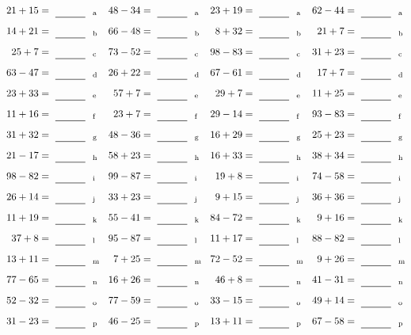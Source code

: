 \documentclass
[
  draft    = true,
  fontsize = 11pt,
  parskip  = half-
]
{scrartcl}
\begin{document}
\clearpage
\begin{align*}
    \pline{21+15}&=\rline{a}
  & \pline{48-34}&=\rline{a}
  & \pline{23+19}&=\rline{a}
  & \pline{62-44}&=\rline{a} \\[1ex]
    \pline{14+21}&=\rline{b}
  & \pline{66-48}&=\rline{b}
  & \pline{8+32}&=\rline{b}
  & \pline{21+7}&=\rline{b} \\[1ex]
    \pline{25+7}&=\rline{c}
  & \pline{73-52}&=\rline{c}
  & \pline{98-83}&=\rline{c}
  & \pline{31+23}&=\rline{c} \\[1ex]
    \pline{63-47}&=\rline{d}
  & \pline{26+22}&=\rline{d}
  & \pline{67-61}&=\rline{d}
  & \pline{17+7}&=\rline{d} \\[1ex]
    \pline{23+33}&=\rline{e}
  & \pline{57+7}&=\rline{e}
  & \pline{29+7}&=\rline{e}
  & \pline{11+25}&=\rline{e} \\[1ex]
    \pline{11+16}&=\rline{f}
  & \pline{23+7}&=\rline{f}
  & \pline{29-14}&=\rline{f}
  & \pline{93-83}&=\rline{f} \\[1ex]
    \pline{31+32}&=\rline{g}
  & \pline{48-36}&=\rline{g}
  & \pline{16+29}&=\rline{g}
  & \pline{25+23}&=\rline{g} \\[1ex]
    \pline{21-17}&=\rline{h}
  & \pline{58+23}&=\rline{h}
  & \pline{16+33}&=\rline{h}
  & \pline{38+34}&=\rline{h} \\[1ex]
    \pline{98-82}&=\rline{i}
  & \pline{99-87}&=\rline{i}
  & \pline{19+8}&=\rline{i}
  & \pline{74-58}&=\rline{i} \\[1ex]
    \pline{26+14}&=\rline{j}
  & \pline{33+23}&=\rline{j}
  & \pline{9+15}&=\rline{j}
  & \pline{36+36}&=\rline{j} \\[1ex]
    \pline{11+19}&=\rline{k}
  & \pline{55-41}&=\rline{k}
  & \pline{84-72}&=\rline{k}
  & \pline{9+16}&=\rline{k} \\[1ex]
    \pline{37+8}&=\rline{l}
  & \pline{95-87}&=\rline{l}
  & \pline{11+17}&=\rline{l}
  & \pline{88-82}&=\rline{l} \\[1ex]
    \pline{13+11}&=\rline{m}
  & \pline{7+25}&=\rline{m}
  & \pline{72-52}&=\rline{m}
  & \pline{9+26}&=\rline{m} \\[1ex]
    \pline{77-65}&=\rline{n}
  & \pline{16+26}&=\rline{n}
  & \pline{46+8}&=\rline{n}
  & \pline{41-31}&=\rline{n} \\[1ex]
    \pline{52-32}&=\rline{o}
  & \pline{77-59}&=\rline{o}
  & \pline{33-15}&=\rline{o}
  & \pline{49+14}&=\rline{o} \\[1ex]
    \pline{31-23}&=\rline{p}
  & \pline{46-25}&=\rline{p}
  & \pline{13+11}&=\rline{p}
  & \pline{67-58}&=\rline{p}
\end{align*}
\end{document}
